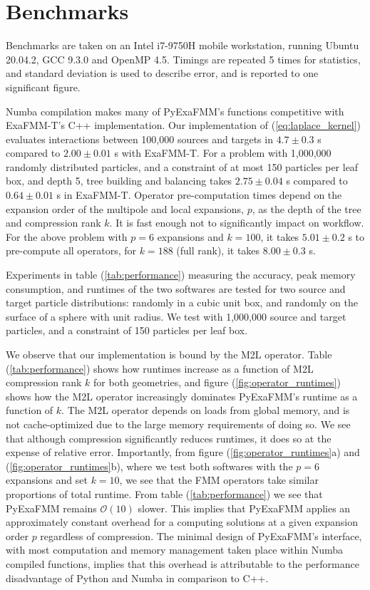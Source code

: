 \documentclass{IEEEcsmag}
\begin{document}
\section{Benchmarks}

Benchmarks are taken on an Intel i7-9750H mobile workstation, running Ubuntu 20.04.2, GCC 9.3.0 and OpenMP 4.5. Timings are repeated 5 times for statistics, and standard deviation is used to describe error, and is reported to one significant figure.

Numba compilation makes many of PyExaFMM's functions competitive with ExaFMM-T's C++ implementation. Our implementation of (\ref{eq:laplace_kernel}) evaluates interactions between 100,000 sources and targets in $4.7 \pm 0.3$ s compared to $2.00 \pm 0.01$ s with ExaFMM-T. For a problem with 1,000,000 randomly distributed particles, and a constraint of at most 150 particles per leaf box, and depth 5, tree building and balancing takes $2.75 \pm 0.04$ s compared to $0.64 \pm 0.01$ s in ExaFMM-T. Operator pre-computation times depend on the expansion order of the multipole and local expansions, $p$, as the depth of the tree and compression rank $k$. It is fast enough not to significantly impact on workflow. For the above problem with $p=6$ expansions and $k=100$, it takes $5.01 \pm 0.2$ s to pre-compute all operators, for $k=188$ (full rank), it takes $8.00 \pm 0.3$ s.

Experiments in table (\ref{tab:performance}) measuring the accuracy, peak memory consumption, and runtimes of the two softwares are tested for two source and target particle distributions: randomly in a cubic unit box, and randomly on the surface of a sphere with unit radius. We test with 1,000,000 source and target particles, and a constraint of 150 particles per leaf box.

We observe that our implementation is bound by the M2L operator. Table (\ref{tab:performance}) shows how runtimes increase as a function of M2L compression rank $k$ for both geometries, and figure (\ref{fig:operator_runtimes}) shows how the M2L operator increasingly dominates PyExaFMM's runtime as a function of $k$. The M2L operator depends on loads from global memory, and is not cache-optimized due to the large memory requirements of doing so. We see that although compression significantly reduces runtimes, it does so at the expense of relative error. Importantly, from figure (\ref{fig:operator_runtimes}a) and (\ref{fig:operator_runtimes}b), where we test both softwares with the $p=6$ expansions and set $k=10$, we see that the FMM operators take similar proportions of total runtime. From table (\ref{tab:performance}) we see that PyExaFMM remains $\mathcal{O}(10)$ slower. This implies that PyExaFMM applies an approximately constant overhead for a computing solutions at a given expansion order $p$ regardless of compression. The minimal design of PyExaFMM's interface, with most computation and memory management taken place within Numba compiled functions, implies that this overhead is attributable to the performance disadvantage of Python and Numba in comparison to C++.
\end{document}
